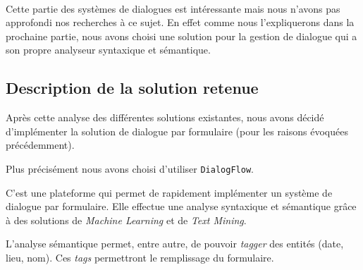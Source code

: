 ~\\\indent
Cette partie des systèmes de dialogues est intéressante mais nous n'avons pas approfondi nos recherches à ce sujet. En effet comme nous l'expliquerons dans la prochaine partie, nous avons choisi une solution pour la gestion de dialogue qui a son propre analyseur syntaxique et sémantique.

\subsection{Description de la solution retenue}
Après cette analyse des différentes solutions existantes, nous avons décidé d'implémenter la solution de dialogue par formulaire (pour les raisons évoquées précédemment). 

Plus précisément nous avons choisi d'utiliser \texttt{DialogFlow}. 

C'est une plateforme qui permet de rapidement implémenter un système de dialogue par formulaire. Elle effectue une analyse syntaxique et sémantique grâce à des solutions de \textit{Machine Learning} et de \emph{Text Mining}. 

L'analyse sémantique permet, entre autre, de pouvoir \emph{tagger} des entités (date, lieu, nom). Ces \emph{tags} permettront le remplissage du formulaire.